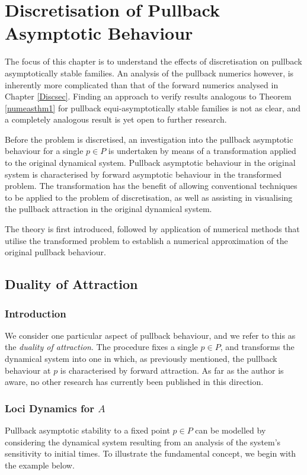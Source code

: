 \chapter[Numerical Approximation - II]
         {Discretisation of Pullback Asymptotic Behaviour}
\label{chpbackdisc}

The focus of this chapter is to understand the effects of discretisation on
pullback asymptotically stable families. An analysis of the pullback
numerics however, is inherently more complicated than that of the forward
numerics analysed in Chapter \ref{Discsec}. Finding an approach to verify
results analogous to Theorem \ref{numeasthm1} for pullback equi-asymptotically
stable families is not as clear, and a completely analogous result is yet
open to further research.

Before the problem is discretised, an investigation into the
pullback asymptotic behaviour for a single $p \in P$ is undertaken
by means of a transformation applied to the original dynamical
system. Pullback asymptotic behaviour in the original system is
characterised by forward asymptotic behaviour in the transformed
problem. The transformation has the benefit of allowing
conventional techniques to be applied to the problem of
discretisation, as well as assisting in visualising the pullback
attraction in the original dynamical system.

The theory is first introduced, followed by application of numerical methods
that utilise the transformed problem to establish a numerical approximation of
the original pullback behaviour.

\section{Duality of Attraction}\label{secduality}

\subsection{Introduction}

We consider one particular aspect of pullback behaviour,
and we refer to this as the \textit{duality of attraction}. The procedure
fixes a single $p \in P$, and transforms the dynamical system
into one  in which, as previously mentioned, the pullback behaviour at $p$ is
characterised by forward attraction. As far as the author
is aware, no other research has currently been published in this direction.

\subsection{Loci Dynamics for $A$}
\label{ssecLoci1}
Pullback asymptotic stability to a fixed point $p \in P$ can be
modelled by considering the dynamical system resulting from an
analysis of the system's sensitivity to initial times. To illustrate the
fundamental concept, we begin with the example below.

